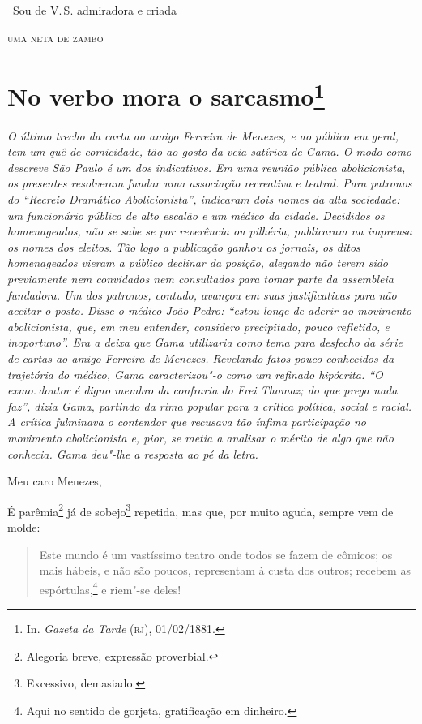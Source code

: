 \hfill\ Sou de V.\,S. admiradora e criada

\hfill\textsc{uma neta de zambo}

\chapter{No verbo mora o sarcasmo\footnote[*]{In.
  \emph{Gazeta da Tarde} (\textsc{rj}), 01/02/1881.}}

\begin{flushleft}
{\footnotesize\itshape
O último trecho da carta ao amigo Ferreira de Menezes, e ao
público em geral, tem um quê de comicidade, tão ao gosto da veia
satírica de Gama. O modo como descreve São Paulo é um dos indicativos.
Em uma reunião pública abolicionista, os presentes
resolveram fundar uma associação recreativa e teatral. Para patronos do
``Recreio Dramático Abolicionista'', indicaram dois nomes da alta
sociedade: um funcionário público de alto escalão e um médico da cidade.
Decididos os homenageados, não se sabe se por reverência ou pilhéria,
publicaram na imprensa os nomes dos eleitos. Tão logo a publicação
ganhou os jornais, os ditos homenageados vieram a público declinar da
posição, alegando não terem sido previamente nem convidados nem
consultados para tomar parte da assembleia fundadora. Um dos patronos,
contudo, avançou em suas justificativas para não aceitar o posto. Disse
o médico João Pedro: ``estou longe de aderir ao movimento abolicionista,
que, em meu entender, considero precipitado, pouco refletido, e
inoportuno''. Era a deixa que Gama utilizaria como tema para desfecho da
série de cartas ao amigo Ferreira de Menezes. Revelando fatos pouco
conhecidos da trajetória do médico, Gama caracterizou"-o como um refinado hipócrita.
``O exmo.\,doutor é digno membro da confraria do Frei Thomaz; do que prega nada
faz'', dizia Gama, partindo da rima popular para a crítica política,
social e racial. A crítica fulminava o contendor que recusava tão ínfima
participação no movimento abolicionista e, pior, se metia a analisar o
mérito de algo que não conhecia. Gama deu"-lhe a resposta ao pé da letra.}
\end{flushleft}\pagebreak

\noindent{}Meu caro Menezes,\smallskip

É parêmia\footnote{Alegoria breve, expressão proverbial.} já de
sobejo\footnote{Excessivo, demasiado.} repetida, mas que, por muito
aguda, sempre vem de molde:

\begin{quote}
Este mundo é um vastíssimo teatro onde todos se fazem de cômicos; os
mais hábeis, e não são poucos, representam à custa dos outros; recebem
as espórtulas,\footnote{Aqui no sentido de gorjeta, gratificação em
  dinheiro.} e riem"-se deles!
\end{quote}

